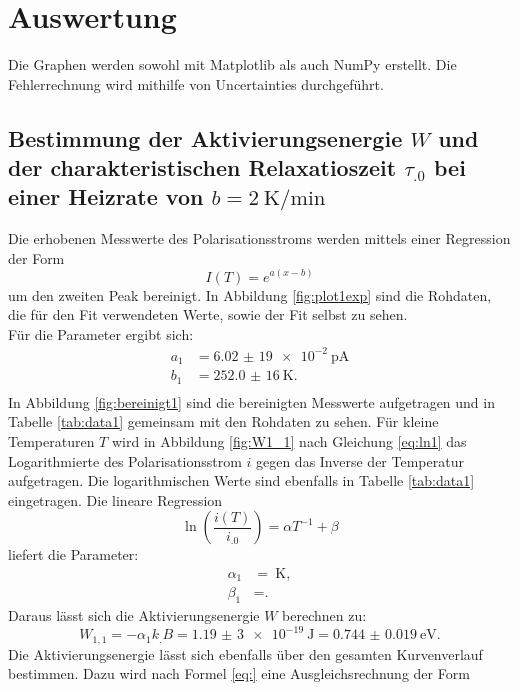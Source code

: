 \section{Auswertung}
\label{sec:Auswertung}

Die Graphen werden sowohl mit Matplotlib \cite{matplotlib} als auch NumPy \cite{numpy} erstellt. Die Fehlerrechnung wird mithilfe von Uncertainties \cite{uncertainties} durchgeführt.

\subsection{Bestimmung der Aktivierungsenergie $W$ und der charakteristischen Relaxatioszeit $\tau_.0$ bei einer Heizrate von $b=\SI{2}{\kelvin\per\minute}$}

Die erhobenen Messwerte des Polarisationsstroms werden mittels einer Regression der Form
\begin{equation}
I(T)=e^{a(x-b)} \label{eq:reg1}
\end{equation}
um den zweiten Peak bereinigt. In Abbildung \ref{fig:plot1exp} sind die Rohdaten, die für den Fit verwendeten Werte, sowie der Fit selbst zu sehen.\\
Für die Parameter ergibt sich:
\begin{align*}
a_1&=\SI{6,02(19)e-2}{\pico\ampere}\\
b_1&=\SI{252,0(16)}{\kelvin}\text{.}\\
\end{align*}
In Abbildung \ref{fig:bereinigt1} sind die bereinigten Messwerte aufgetragen und in Tabelle \ref{tab:data1} gemeinsam mit den Rohdaten zu sehen.
Für kleine Temperaturen $T$ wird in Abbildung \ref{fig:W1_1} nach Gleichung \eqref{eq:ln1} das Logarithmierte des Polarisationsstrom $i$ gegen das Inverse der Temperatur aufgetragen. Die logarithmischen Werte sind ebenfalls in Tabelle \ref{tab:data1} eingetragen.
Die lineare Regression
\begin{equation}
\ln\left(\frac{i(T)}{i_.0}\right)=\alpha T^{-1}+\beta \label{eq:reg2}
\end{equation}
liefert die Parameter:
\begin{align*}
\alpha_1&=\SI{}{\kelvin},\\
\beta_1 &= \text{.}
\end{align*}
Daraus lässt sich die Aktivierungsenergie $W$ berechnen zu:
\[
W_{1,1} = -\alpha_1 k_.B =\SI{1,19(3)e-19}{\joule}=\SI{0.744(19)}{\electronvolt}\text{.}
\]
Die Aktivierungsenergie lässt sich ebenfalls über den gesamten Kurvenverlauf bestimmen. Dazu wird nach Formel \eqref{eq:} eine Ausgleichsrechnung der Form 
